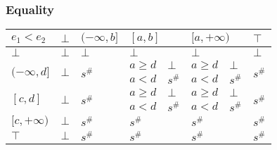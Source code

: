 \documentclass{beamer}
\begin{document}
        \begin{frame}
            \frametitle{Equality}
    \begin{table}[]
        \begin{tabular}{|l|l|l|ll|ll|l|}
        \hline
        $e_1 < e_2$                     & $\bot$                  & $(-\infty, b]$          & \multicolumn{2}{l|}{$[a, b]$} & \multicolumn{2}{l|}{$[a, +\infty)$} & $\top$                  \\ \hline
        $\bot$                          & $\bot$                  & $\bot$                  & \multicolumn{2}{l|}{$\bot$}   & \multicolumn{2}{l|}{$\bot$}         & $\bot$                  \\ \hline
        \multirow{2}{*}{$(-\infty, d]$} & \multirow{2}{*}{$\bot$} & \multirow{2}{*}{$s^\#$} & $a \ge d$       & $\bot$      & $a \ge d$          & $\bot$         & \multirow{2}{*}{$s^\#$} \\
                                        &                         &                         & $a < d$         & $s^\#$      & $a < d$            & $s^\#$         &                         \\ \hline
        \multirow{2}{*}{$[c, d]$}       & \multirow{2}{*}{$\bot$} & \multirow{2}{*}{$s^\#$} & $a \ge d$       & $\bot$      & $a \ge d$          & $\bot$         & \multirow{2}{*}{$s^\#$} \\
                                        &                         &                         & $a < d$         & $s^\#$      & $a < d$            & $s^\#$         &                         \\ \hline
        $[c, +\infty)$                  & $\bot$                  & $s^\#$                  & \multicolumn{2}{l|}{$s^\#$}   & \multicolumn{2}{l|}{$s^\#$}         & $s^\#$                  \\ \hline
        $\top$                          & $\bot$                  & $s^\#$                  & \multicolumn{2}{l|}{$s^\#$}   & \multicolumn{2}{l|}{$s^\#$}         & $s^\#$                  \\ \hline
        \end{tabular}
        \end{table}
    \end{frame}
    
\end{document}
